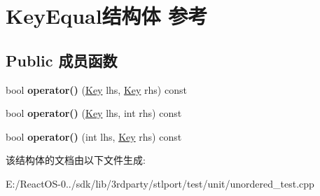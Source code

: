 \hypertarget{struct_key_equal}{}\section{Key\+Equal结构体 参考}
\label{struct_key_equal}
\subsection*{Public 成员函数}
\begin{DoxyCompactItemize}
\item 
\mbox{\label{struct_key_equal_a75aeecf23ebdc0a865ffcd201640e4f9}} 
bool {\bfseries operator()} (\hyperlink{struct_key}{Key} lhs, \hyperlink{struct_key}{Key} rhs) const
\item 
\mbox{\label{struct_key_equal_a3f857d3c9ea521a601e9e7e6dd131a56}} 
bool {\bfseries operator()} (\hyperlink{struct_key}{Key} lhs, int rhs) const
\item 
\mbox{\label{struct_key_equal_a14820e0b1162c388e390679121d2eb48}} 
bool {\bfseries operator()} (int lhs, \hyperlink{struct_key}{Key} rhs) const
\end{DoxyCompactItemize}


该结构体的文档由以下文件生成\+:\begin{DoxyCompactItemize}
\item 
E\+:/\+React\+O\+S-\/0../sdk/lib/3rdparty/stlport/test/unit/unordered\+\_\+test.\+cpp\end{DoxyCompactItemize}
